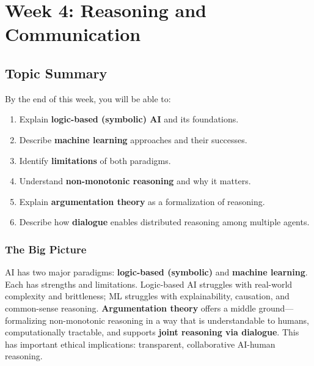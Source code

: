 \section{Week 4: Reasoning and Communication}

\subsection{Topic Summary}

\begin{keybox}
By the end of this week, you will be able to:
\begin{enumerate}
  \item Explain \textbf{logic-based (symbolic) AI} and its foundations.
  \item Describe \textbf{machine learning} approaches and their successes.
  \item Identify \textbf{limitations} of both paradigms.
  \item Understand \textbf{non-monotonic reasoning} and why it matters.
  \item Explain \textbf{argumentation theory} as a formalization of reasoning.
  \item Describe how \textbf{dialogue} enables distributed reasoning among multiple agents.
\end{enumerate}
\end{keybox}

\separator

\subsubsection*{The Big Picture}

AI has two major paradigms: \textbf{logic-based (symbolic)} and \textbf{machine learning}. Each has strengths and limitations. Logic-based AI struggles with real-world complexity and brittleness; ML struggles with explainability, causation, and common-sense reasoning. \textbf{Argumentation theory} offers a middle ground---formalizing non-monotonic reasoning in a way that is understandable to humans, computationally tractable, and supports \textbf{joint reasoning via dialogue}. This has important ethical implications: transparent, collaborative AI-human reasoning.


